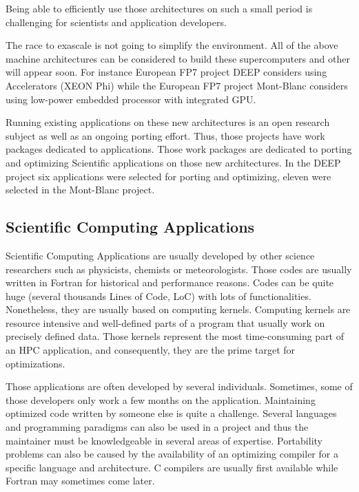 \documentclass{IEEEtran}
\begin{document}
Being able to efficiently use those architectures on such a small period is
challenging for scientists and application developers.

The race to exascale is not going to simplify the environment. All of the above
machine architectures can be considered to build these supercomputers and other
will appear soon. For instance European FP7 project DEEP considers using
Accelerators (XEON Phi) while the European FP7 project Mont-Blanc considers
using low-power embedded processor with integrated GPU.

Running existing applications on these new architectures is an open research
subject as well as an ongoing porting effort.  Thus, those projects have work
packages dedicated to applications. Those work packages are dedicated to
porting and optimizing Scientific applications on those new architectures. In
the DEEP project six applications were selected for porting and optimizing,
eleven were selected in the Mont-Blanc project.

\subsection{Scientific Computing Applications}

Scientific Computing Applications are usually developed by other science
researchers such as physicists, chemists or meteorologists. Those codes are
usually written in Fortran for historical and performance reasons. Codes can be
quite huge (several thousands Lines of Code, LoC) with lots of functionalities.
Nonetheless, they are usually based on computing kernels.  Computing kernels
are resource intensive and well-defined parts of a program that usually work on
precisely defined data. Those kernels represent the most time-consuming part of
an HPC application, and consequently, they are the prime target for
optimizations.

Those applications are often developed by several individuals. Sometimes, some
of those developers only work a few months on the application. Maintaining
optimized code written by someone else is quite a challenge. Several languages
and programming paradigms can also be used in a project and thus the maintainer
must be knowledgeable in several areas of expertise. Portability problems can
also be caused by the availability of an optimizing compiler for a specific
language and architecture. C compilers are usually first available while
Fortran may sometimes come later.
\end{document}
